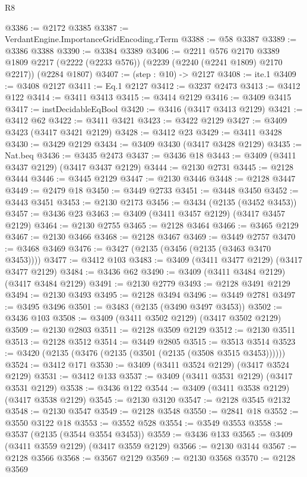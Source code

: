 \begin{lexlean}{R8}
\begin{coremodule}
@3386 := @2172 @3385
@3387 := VerdantEngine.ImportanceGridEncoding.rTerm
@3388 := @58 @3387
@3389 := @3386 @3388
@3390 := @3384 @3389
@3406 := @2211
    @576
    @2170
    @3389
    @1809
    @2217
    (@2222 (@2233 @576))
    (@2239 (@2240 (@2241 @1809) @2170 @2217))
    (@2284 @1807)
@3407 := (step : @10) -> @2127
@3408 := ite.{1}
@3409 := @3408 @2127
@3411 := Eq.{1} @2127
@3412 := @3237 @2473
@3413 := @3412 @122
@3414 := @3411 @3413
@3415 := @3414 @2129
@3416 := @3409 @3415
@3417 := instDecidableEqBool
@3420 := @3416 (@3417 @3413 @2129)
@3421 := @3412 @62
@3422 := @3411 @3421
@3423 := @3422 @2129
@3427 := @3409 @3423 (@3417 @3421 @2129)
@3428 := @3412 @23
@3429 := @3411 @3428
@3430 := @3429 @2129
@3434 := @3409 @3430 (@3417 @3428 @2129)
@3435 := Nat.beq
@3436 := @3435 @2473
@3437 := @3436 @18
@3443 := @3409 (@3411 @3437 @2129) (@3417 @3437 @2129)
@3444 := @2130 @2731
@3445 := @2128 @3444
@3446 := @3445 @2129
@3447 := @2130 @3446
@3448 := @2128 @3447
@3449 := @2479 @18
@3450 := @3449 @2733
@3451 := @3448 @3450
@3452 := @3443 @3451
@3453 := @2130 @2173
@3456 := @3434 (@2135 (@3452 @3453))
@3457 := @3436 @23
@3463 := @3409 (@3411 @3457 @2129) (@3417 @3457 @2129)
@3464 := @2130 @2755
@3465 := @2128 @3464
@3466 := @3465 @2129
@3467 := @2130 @3466
@3468 := @2128 @3467
@3469 := @3449 @2757
@3470 := @3468 @3469
@3476 := @3427 (@2135 (@3456 (@2135 (@3463 @3470 @3453))))
@3477 := @3412 @103
@3483 := @3409 (@3411 @3477 @2129) (@3417 @3477 @2129)
@3484 := @3436 @62
@3490 := @3409 (@3411 @3484 @2129) (@3417 @3484 @2129)
@3491 := @2130 @2779
@3493 := @2128 @3491 @2129
@3494 := @2130 @3493
@3495 := @2128 @3494
@3496 := @3449 @2781
@3497 := @3495 @3496
@3501 := @3483 (@2135 (@3490 @3497 @3453))
@3502 := @3436 @103
@3508 := @3409 (@3411 @3502 @2129) (@3417 @3502 @2129)
@3509 := @2130 @2803
@3511 := @2128 @3509 @2129
@3512 := @2130 @3511
@3513 := @2128 @3512
@3514 := @3449 @2805
@3515 := @3513 @3514
@3523 := @3420 (@2135 (@3476 (@2135 (@3501 (@2135 (@3508 @3515 @3453))))))
@3524 := @3412 @171
@3530 := @3409 (@3411 @3524 @2129) (@3417 @3524 @2129)
@3531 := @3412 @133
@3537 := @3409 (@3411 @3531 @2129) (@3417 @3531 @2129)
@3538 := @3436 @122
@3544 := @3409 (@3411 @3538 @2129) (@3417 @3538 @2129)
@3545 := @2130 @3120
@3547 := @2128 @3545 @2132
@3548 := @2130 @3547
@3549 := @2128 @3548
@3550 := @2841 @18
@3552 := @3550 @3122 @18
@3553 := @3552 @528
@3554 := @3549 @3553
@3558 := @3537 (@2135 (@3544 @3554 @3453))
@3559 := @3436 @133
@3565 := @3409 (@3411 @3559 @2129) (@3417 @3559 @2129)
@3566 := @2130 @3144
@3567 := @2128 @3566
@3568 := @3567 @2129
@3569 := @2130 @3568
@3570 := @2128 @3569

\end{coremodule}
\end{lexlean}
